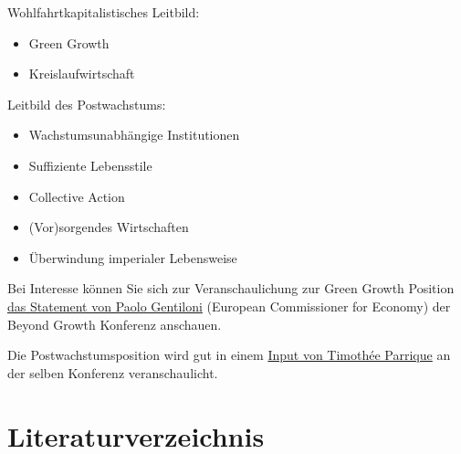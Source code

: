 \documentclass[
  nswissgerman,
  a4paper,
  DIV=11,
  numbers=noendperiod,
  oneside,
  openany]{scrreprt}
\begin{document}
Wohlfahrtkapitalistisches Leitbild:

\begin{itemize}
\item
  Green Growth
\item
  Kreislaufwirtschaft
\end{itemize}

Leitbild des Postwachstums:

\begin{itemize}
\item
  Wachstumsunabhängige Institutionen
\item
  Suffiziente Lebensstile
\item
  Collective Action
\item
  (Vor)sorgendes Wirtschaften
\item
  Überwindung imperialer Lebensweise
\end{itemize}

\begin{tcolorbox}[enhanced jigsaw, arc=.35mm, bottomrule=.15mm, bottomtitle=1mm, breakable, colback=white, colbacktitle=quarto-callout-caution-color!10!white, colframe=quarto-callout-caution-color-frame, coltitle=black, left=2mm, leftrule=.75mm, opacityback=0, opacitybacktitle=0.6, rightrule=.15mm, title={Weiterführende Literatur}, titlerule=0mm, toprule=.15mm, toptitle=1mm]

Bei Interesse können Sie sich zur Veranschaulichung zur Green Growth
Position \href{https://www.youtube.com/watch?v=2rYNewZEazA&t=1129s}{das
Statement von Paolo Gentiloni} (European Commissioner for Economy) der
Beyond Growth Konferenz anschauen.

Die Postwachstumsposition wird gut in einem
\href{https://www.youtube.com/watch?v=vij3Q6bE6X4}{Input von Timothée
Parrique} an der selben Konferenz veranschaulicht.

\end{tcolorbox}


\chapter*{Literaturverzeichnis}\label{literaturverzeichnis}

\end{document}
